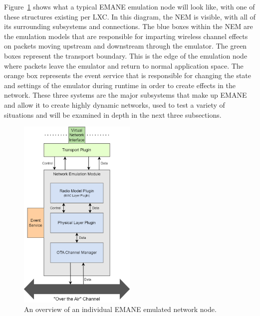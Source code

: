 Figure~\ref{emane_diagram} shows what a typical EMANE emulation node will look like, with one of these structures existing per LXC.
In this diagram, the NEM is visible, with all of its surrounding subsystems and connections.
The blue boxes within the NEM are the emulation models that are responsible for imparting wireless channel effects on packets moving upstream and downstream through the emulator.
The green boxes represent the transport boundary. This is the edge of the emulation node where packets leave the emulator and return to normal application space.
The orange box represents the event service that is responsible for changing the state and settings of the emulator during runtime in order to create effects in the network.
These three systems are the major subsystems that make up EMANE and allow it to create highly dynamic networks, used to test a variety of situations and will be examined in depth in the next three subsections.

\begin{figure}[!ht]
    \centering
    \includegraphics[width=0.5\textwidth,keepaspectratio]{Images/Chpt2/emane_diagram.png}
    \caption{An overview of an individual EMANE emulated network node.}
    \label{emane_diagram}
\end{figure}

